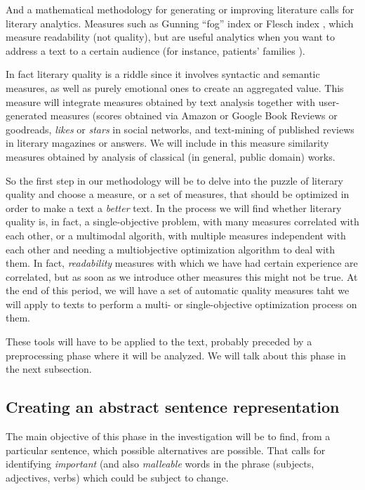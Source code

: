 \documentclass[a4paper,12pt,twocolumn]{article}
\begin{document}
And a mathematical methodology for generating or improving literature
calls for literary analytics. Measures such as Gunning ``fog'' index
\cite{gunning1969fog} or Flesch index \cite{roberts1994effects}, which
measure readability (not quality), but are useful analytics when you
want to address a text to a certain audience (for instance, patients'
families \cite{grossman1994informed}). 

In fact literary quality is a riddle since it involves syntactic and
semantic measures, as well as purely emotional ones to create an aggregated value. This
  measure will integrate measures obtained by text analysis together
  with user-generated measures (scores obtained via Amazon or Google
  Book Reviews or goodreads, {\em likes} or {\em stars} in social
  networks, and text-mining of published reviews in literary magazines
  or answers. We will include in this measure similarity measures
  obtained by analysis of classical (in general, public domain)
  works. 

So the first step in our methodology will be to delve into the puzzle
of literary quality and choose a measure, or a set of measures, that
should be optimized in order to make a text a {\em better} text. In
the process we will find whether literary quality is, in fact, a
single-objective problem, with many measures correlated with each
other, or a multimodal algorith, with multiple measures independent
with each other and needing a multiobjective optimization algorithm to
deal with them. In fact, {\em readability} measures with which we have
had certain experience are correlated, but as soon as we introduce
other measures this might not be true. At the end of this period, we
will have a set of automatic quality measures taht we will apply to
texts to perform a multi- or single-objective optimization process on
them. 

These tools will have to be applied to the text, probably preceded by
a preprocessing phase where it will be analyzed. We will talk about
this phase in the next subsection.

\subsection{Creating an abstract sentence representation}

The main objective of this phase in the investigation will be to find,
from a particular sentence, which possible alternatives are
possible. That calls for identifying {\em important} (and also {\em malleable} words in the
phrase (subjects, adjectives, verbs) which could be subject to
change. 
\end{document}
